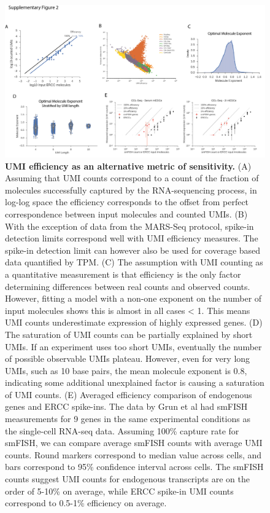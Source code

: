 \begin{figure}
    \centering
    \includegraphics[width=\textwidth]{"Supp Figure 2"}
    \caption[UMI efficiency as an alternative metric of sensitivity]{\textbf{UMI efficiency as an alternative metric of sensitivity.} (A) Assuming that UMI counts correspond to a count of the fraction of molecules successfully captured by the RNA-sequencing process, in log-log space the efficiency corresponds to the offset from perfect correspondence between input molecules and counted UMIs. (B) With the exception of data from the MARS-Seq protocol, spike-in detection limits correspond well with UMI efficiency measures. The spike-in detection limit can however also be used for coverage based data quantified by TPM. (C) The assumption with UMI counting as a quantitative measurement is that efficiency is the only factor determining differences between real counts and observed counts. However, fitting a model with a non-one exponent on the number of input molecules shows this is almost in all cases < 1. This means UMI counts underestimate expression of highly expressed genes. (D) The saturation of UMI counts can be partially explained by short UMIs. If an experiment uses too short UMIs, eventually the number of possible observable UMIs plateau. However, even for very long UMIs, such as 10 base pairs, the mean molecule exponent is 0.8, indicating some additional unexplained factor is causing a saturation of UMI counts. (E) Averaged efficiency comparison of endogenous genes and ERCC spike-ins. The data by Grun et al had smFISH measurements for 9 genes in the same experimental conditions as the single-cell RNA-seq data. Assuming 100\% capture rate for smFISH, we can compare average smFISH counts with average UMI counts. Round markers correspond to median value across cells, and bars correspond to 95\% confidence interval across cells. The smFISH counts suggest UMI counts for endogenous transcripts are on the order of 5-10\% on average, while ERCC spike-in UMI counts correspond to 0.5-1\% efficiency on average.}
    \label{fig:umi-efficiency}
\end{figure}

